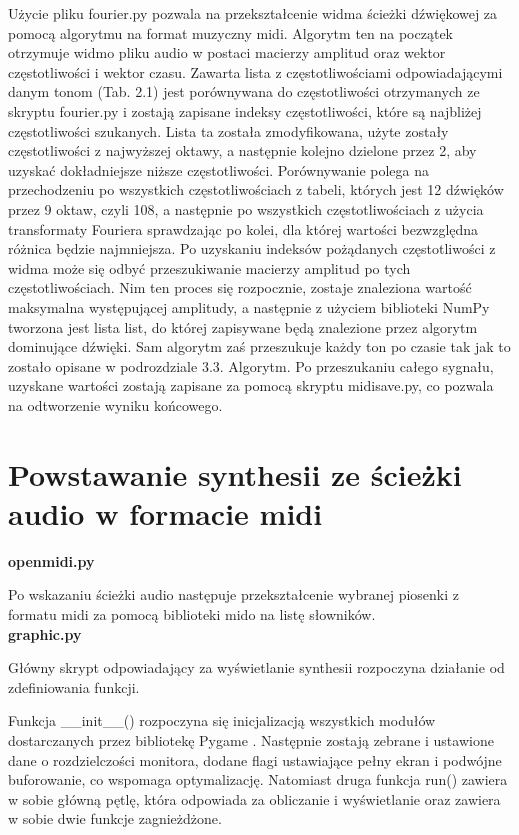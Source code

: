 Użycie pliku fourier.py pozwala na przekształcenie widma ścieżki dźwiękowej za pomocą algorytmu na format muzyczny midi. 
Algorytm ten na początek otrzymuje widmo pliku audio w postaci macierzy amplitud oraz wektor częstotliwości i wektor czasu. Zawarta lista z częstotliwościami odpowiadającymi danym tonom (Tab. 2.1) jest porównywana do częstotliwości otrzymanych ze skryptu fourier.py i zostają zapisane indeksy częstotliwości, które są najbliżej częstotliwości szukanych. Lista ta została zmodyfikowana, użyte zostały częstotliwości z najwyższej oktawy, a następnie kolejno dzielone przez 2, aby uzyskać dokładniejsze niższe częstotliwości. Porównywanie polega na przechodzeniu po wszystkich częstotliwościach z tabeli, których jest 12 dźwięków przez 9 oktaw, czyli 108, a następnie po wszystkich częstotliwościach z użycia transformaty Fouriera sprawdzając po kolei, dla której wartości bezwzględna różnica będzie najmniejsza. 	
Po uzyskaniu indeksów pożądanych częstotliwości z widma może się odbyć przeszukiwanie macierzy amplitud po tych częstotliwościach. Nim ten proces się rozpocznie, zostaje znaleziona wartość maksymalna występującej amplitudy, a następnie z użyciem biblioteki NumPy \cite{numpy} tworzona jest lista list, do której zapisywane będą znalezione przez algorytm dominujące dźwięki. Sam algorytm zaś przeszukuje każdy ton po czasie tak jak to zostało opisane w podrozdziale 3.3. Algorytm.
Po przeszukaniu całego sygnału, uzyskane wartości zostają zapisane za pomocą skryptu midisave.py, co pozwala na odtworzenie wyniku końcowego.

\section{Powstawanie synthesii ze ścieżki audio w formacie midi}

\noindent\textbf{openmidi.py}

Po wskazaniu ścieżki audio następuje przekształcenie wybranej piosenki z formatu midi za pomocą biblioteki mido \cite{mido} na listę słowników.\\

\noindent\textbf{graphic.py}

Główny skrypt odpowiadający za wyświetlanie synthesii rozpoczyna działanie od zdefiniowania funkcji. 

Funkcja \_\_init\_\_() rozpoczyna się inicjalizacją wszystkich modułów dostarczanych przez bibliotekę Pygame \cite{pygame}. Następnie zostają zebrane i ustawione dane o rozdzielczości monitora, dodane flagi ustawiające pełny ekran i podwójne buforowanie, co wspomaga optymalizację. Natomiast druga funkcja run() zawiera w sobie główną pętlę, która odpowiada za obliczanie i wyświetlanie oraz zawiera w sobie dwie funkcje zagnieżdżone.


